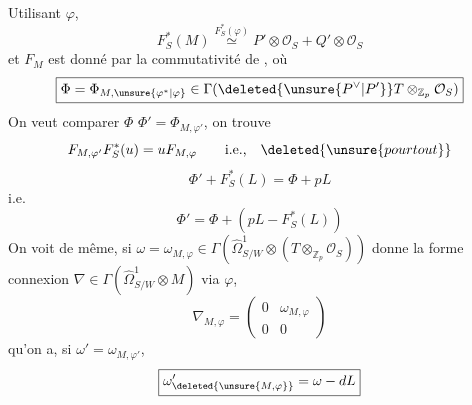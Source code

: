 Utilisant $\varphi$, 
\[
F_S^*(M)\overset{F_S^*(\varphi)}\simeq P'\otimes\mathcal O_S+Q'\otimes\mathcal O_S
\]
et $F_M$ est donné par la commutativité de
,
\deleted{$\unsure{\Rightarrow}$} où
\[
\boxed{\Phi=\Phi_{M,\unsure{\varphi^*|\varphi}}\in\Gamma(\deleted{\unsure{P^\vee|P'}}T\otimes_{\mathbb Z_p}\mathcal O_S)}
\]
On veut comparer $\Phi$  $\Phi'=\Phi_{M,\varphi'}$, on trouve
\[
F_{M,\varphi'}F_S^*(u)=uF_{M,\varphi}\qquad\text{i.e.,}\quad\deleted{\unsure{pour tout}}
\]
\[
\Phi'+F_S^*(L)=\Phi+pL
\]
i.e.
\[\boxed{\Phi'=\Phi+(pL-F_S^*(L))}\]
On voit de même, si $\omega=\omega_{M,\varphi}\in\Gamma(\widehat\Omega^1_{S/W}\otimes(T\otimes_{\mathbb Z_p}\mathcal O_S))$ donne la forme connexion $\nabla\in\Gamma(\widehat\Omega^1_{S/W}\otimes M)$ via $\varphi$,
\[
\nabla_{M,\varphi}=\begin{pmatrix}0&\omega_{M,\varphi}\\0&0\end{pmatrix}
\]
qu'on a, si $\omega'=\omega_{M,\varphi'}$, 
\[\boxed{\omega'_{\deleted{\unsure{M,\varphi}}}=\omega-dL}\]

